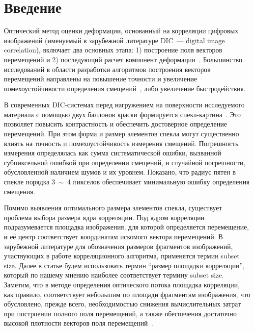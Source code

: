 \newpage
\section{Введение}



Оптический метод оценки деформации, основанный на корреляции цифровых изображений (именуемый в зарубежной литературе {DIC}~--- digital image correlation), включает два основных этапа: 1) построение поля векторов перемещений и 2) последующий расчет компонент деформации~\cite{pan_intro_one}. Большинство исследований в области разработки алгоритмов построения векторов перемещений направлены на повышение точности и увеличение помехоустойчивости определения смещений~\cite{pan_intro_two, pan_intro_three}, либо увеличение быстродействия.

В современных DIC-системах перед нагружением на поверхности исследуемого материала с помощью двух баллонов краски формируется спекл-картина~\cite{pan_intro_one}. Это позволяет повысить контрастность и обеспечить достоверное определение перемещений.
При этом форма и размер элементов спекла могут существенно влиять на точность и помехоустойчивость измерения смещений.
Погрешность измерения определялась как сумма систематической ошибки, вызванной субпиксельной ошибкой при определении смещений, и случайной погрешности, обусловленной наличием шумов и их уровнем. Показано, что радиус пятен в спекле порядка 3~$\sim$~4 пикселов обеспечивает минимальную ошибку определения смещения.

Помимо выявления оптимального размера элементов спекла, существует проблема выбора размера ядра корреляции. Под ядром корреляции подразумевается площадка изображения, для которой определяется перемещение, и её центр соответствует координатам искомого вектора перемещений. В зарубежной литературе для обозначения размеров фрагментов изображений, участвующих в работе корреляционного алгоритма, применятся термин subset size. Далее в статье будем использовать термин ``размер площадки корреляции'', который по нашему мнению наиболее соответствует термину subset size. Заметим, что в методе определения оптического потока площадка корреляции, как правило, соответствует небольшим по площади фрагментам изображения, что обусловлено, прежде всего, необходимостью снижения вычислительных затрат при построении полного поля перемещений, а также обеспечения достаточно высокой плотности векторов поля перемещений~\cite{tom_lyk, Lucas1981}.

